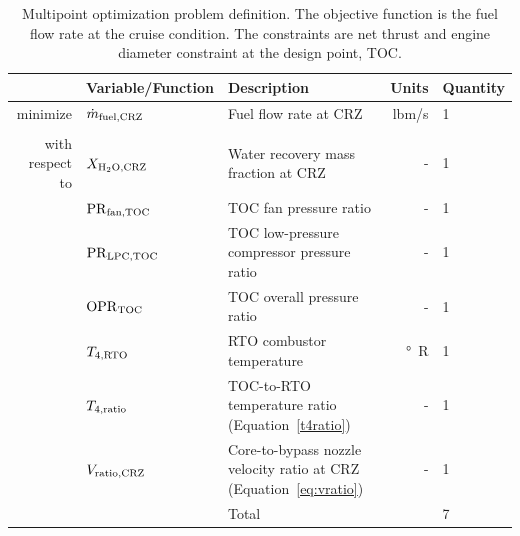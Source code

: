 \documentclass[conf]{new-aiaa}
\begin{document}
\begin{table}[hbt!]
  \centering
  \caption{
    Multipoint optimization problem definition.
    The objective function is the fuel flow rate at the cruise condition.
    The constraints are net thrust and engine diameter constraint at the design point, TOC.
  }
  \small
  \renewcommand{\arraystretch}{1.2}
  \begin{tabular}{r l l r l}
    \toprule
                    & Variable/Function              & Description                                                              & Units          & Quantity \\
    \hline
    minimize        & $\dot{m}_{\rm{fuel,CRZ}} $     & Fuel flow rate at CRZ                                                    & \si{lbm/s}     & 1        \\
                    &                                &                                                                          &                &          \\
    with respect to & $X_{\rm{H_2O,CRZ}}$            & Water recovery mass fraction at CRZ                                      & -              & 1        \\
                    & $\rm{PR}_{\rm{fan,TOC}}$       & TOC fan pressure ratio                                                   & -              & 1        \\
                    & $\rm{PR}_{\rm{LPC,TOC}}$       & TOC low-pressure compressor pressure ratio                               & -              & 1        \\
                    & $\rm{OPR}_{\rm{TOC}}$          & TOC overall pressure ratio                                               & -              & 1        \\
                    & $T_{4,\rm{RTO}}$               & RTO combustor temperature                                                & \si{\degree R} & 1        \\
                    & $T_{4,\rm{ratio}}$             & TOC-to-RTO temperature ratio (Equation~\eqref{t4ratio})                  & -              & 1        \\
                    & $V_{\rm{ratio,CRZ}}$           & Core-to-bypass nozzle velocity ratio at CRZ (Equation~\eqref{eq:vratio}) & -              & 1        \\
    \cline{3-5}
                    &                                & Total                                                                    &                & 7        \\

\end{tabular}
\end{table}
\end{document}
